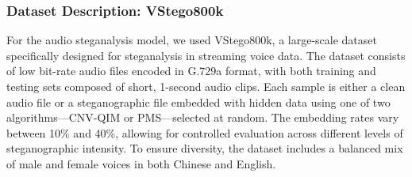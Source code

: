 \documentclass[12pt]{article}
\begin{document}
\subsubsection{Dataset Description: VStego800k}
For the audio steganalysis model, we used VStego800k, a large-scale dataset specifically designed for steganalysis in streaming voice data. The dataset consists of low bit-rate audio files encoded in G.729a format, with both training and testing sets composed of short, 1-second audio clips. Each sample is either a clean audio file or a steganographic file embedded with hidden data using one of two algorithms—CNV-QIM or PMS—selected at random. The embedding rates vary between 10\% and 40\%, allowing for controlled evaluation across different levels of steganographic intensity. To ensure diversity, the dataset includes a balanced mix of male and female voices in both Chinese and English.
\end{document}
